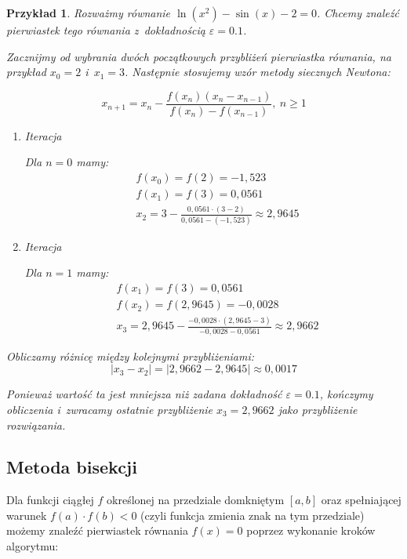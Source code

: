 \documentclass[12pt]{article}
\newtheorem{example}{Przykład}
\begin{document}
\begin{example}
Rozważmy równanie $\ln(x^2) - \sin(x) - 2 = 0$. Chcemy znaleźć pierwiastek tego równania z~dokładnością $\varepsilon = 0.1$.

Zacznijmy od wybrania dwóch początkowych przybliżeń pierwiastka równania, na przykład $x_0 = 2$ i~$x_1 = 3$. Następnie stosujemy wzór metody siecznych Newtona:

$$x_{n+1} = x_n - \frac{f(x_n)(x_n-x_{n-1})}{f(x_n)-f(x_{n-1})},\ n\geq1$$
\begin{enumerate}
    \item Iteracja
    
    Dla $n=0$ mamy:
\begin{align*}
    &f(x_0) = f(2) = -1,523\\
    &f(x_1) = f(3) = 0,0561\\
    &x_{2} = 3 - \frac{0,0561\cdot (3-2)}{0,0561-(-1,523)} \approx 2,9645
\end{align*}
\item Iteracja

Dla $n=1$ mamy:
\begin{align*}
    &f(x_1) = f(3) = 0,0561\\
    &f(x_2) = f(2,9645) = -0,0028\\
    &x_{3} = 2,9645 - \frac{-0,0028\cdot(2,9645-3)}{-0,0028-0,0561} \approx 2,9662
\end{align*}
\end{enumerate}


Obliczamy różnicę między kolejnymi przybliżeniami:
$$|x_{3} - x_{2}| = | 2,9662 - 2,9645| \approx 0,0017$$

Ponieważ wartość ta jest mniejsza niż zadana dokładność $\varepsilon = 0.1$, kończymy obliczenia i~zwracamy ostatnie przybliżenie $x_3 = 2,9662$ jako przybliżenie rozwiązania.
\end{example}

\subsection{Metoda bisekcji}
Dla funkcji ciągłej $f$ określonej na przedziale domkniętym $[a,b]$ oraz spełniającej warunek $f(a) \cdot f(b) < 0$ (czyli funkcja zmienia znak na tym przedziale) możemy znaleźć pierwiastek równania $f(x) = 0$ poprzez wykonanie kroków algorytmu:
\end{document}
